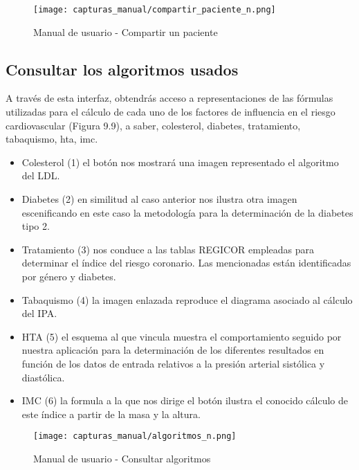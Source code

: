 \documentclass[11pt,spanish,
		listoftables,listoffigures]
		{tfgplantilla}
\begin{document}
\begin{figure}[H]
\centering
\texttt{[image: capturas\_manual/compartir\_paciente\_n.png]}
\caption{Manual de usuario - Compartir un paciente}
\end{figure}

\newpage
\subsection {Consultar los algoritmos usados}

A través de esta interfaz, obtendrás acceso a representaciones de las fórmulas utilizadas para el cálculo de cada uno de los factores de influencia en el riesgo cardiovascular (Figura 9.9), a saber, colesterol, diabetes, tratamiento, tabaquismo, hta, imc.

\begin{itemize}
	\item \textquotedbl Colesterol\textquotedbl{} (1) el botón nos mostrará una imagen representado el algoritmo del LDL.

	\item \textquotedbl Diabetes\textquotedbl{} (2) en similitud al caso anterior nos ilustra otra imagen escenificando en este caso la metodología para la determinación de la diabetes tipo 2.

	\item \textquotedbl Tratamiento\textquotedbl{} (3) nos conduce a las tablas REGICOR empleadas para determinar el índice del riesgo coronario. Las mencionadas están identificadas por género y diabetes.

	\item \textquotedbl Tabaquismo\textquotedbl{} (4) la imagen enlazada reproduce el diagrama asociado al cálculo del IPA.

	\item \textquotedbl HTA\textquotedbl{} (5) el esquema al que vincula muestra el comportamiento seguido por nuestra aplicación para la determinación de los diferentes resultados en función de los datos de entrada relativos a la presión arterial sistólica y diastólica.

	\item \textquotedbl IMC\textquotedbl{} (6) la formula a la que nos dirige el botón ilustra el conocido cálculo de este índice a partir de la masa y la altura.
\end{itemize}

\begin{figure}[H]
\centering
\texttt{[image: capturas\_manual/algoritmos\_n.png]}
\caption{Manual de usuario - Consultar algoritmos}
\end{figure}
\end{document}
